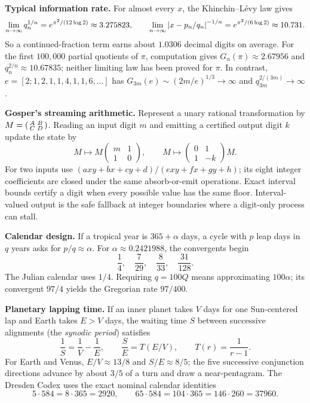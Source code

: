 \textbf{Typical information rate.} For almost every $x$, the Khinchin--L\'evy
law gives
\[
 \lim_{n\to\infty}q_n^{1/n}=e^{\pi^2/(12\log2)}\approx3.275823,
 \qquad
 \lim_{n\to\infty}\left|x-p_n/q_n\right|^{-1/n}
 =e^{\pi^2/(6\log2)}\approx10.731.
\]
So a continued-fraction term earns about $1.0306$ decimal digits on average.
For the first $100{,}000$ partial quotients of $\pi$, computation gives
$G_n(\pi)\approx2.67956$ and $q_n^{2/n}\approx10.67835$; neither limiting law
has been proved for $\pi$. In contrast,
$e=[2;1,2,1,1,4,1,1,6,\dots]$ has
$G_{3m}(e)\sim(2m/e)^{1/3}\to\infty$ and $q_{3m}^{2/(3m)}\to\infty$.

\textbf{Gosper's streaming arithmetic.} Represent a unary rational
transformation by $M=\begin{psmallmatrix}A&B\\C&D\end{psmallmatrix}$.  Reading
an input digit $m$ and emitting a certified output digit $k$ update the state by
\[
 M\longmapsto M\begin{pmatrix}m&1\\1&0\end{pmatrix},
 \qquad
 M\longmapsto\begin{pmatrix}0&1\\1&-k\end{pmatrix}M.
\]
For two inputs use
$(axy+bx+cy+d)/(exy+fx+gy+h)$; its eight integer coefficients are closed
under the same absorb-or-emit operations.  Exact interval bounds certify a
digit when every possible value has the same floor.  Interval-valued output is
the safe fallback at integer boundaries where a digit-only process can stall.

\textbf{Calendar design.} If a tropical year is $365+\alpha$ days, a cycle
with $p$ leap days in $q$ years asks for $p/q\approx\alpha$. For
$\alpha\approx0.2421988$, the convergents begin
\[
 \frac14,\quad\frac7{29},\quad\frac8{33},\quad\frac{31}{128}.
\]
The Julian calendar uses $1/4$. Requiring $q=100Q$ means approximating
$100\alpha$; its convergent $97/4$ yields the Gregorian rate $97/400$.

\textbf{Planetary lapping time.} If an inner planet takes $V$ days for one
Sun-centered lap and Earth takes $E>V$ days, the waiting time $S$ between
successive alignments (the \emph{synodic period}) satisfies
\[
  \frac1S=\frac1V-\frac1E,
  \qquad \frac SE=T(E/V),\qquad T(r)=\frac1{r-1}.
\]
For Earth and Venus, $E/V\approx13/8$ and $S/E\approx8/5$; the five
successive conjunction directions advance by about $3/5$ of a turn and draw a
near-pentagram.  The Dresden Codex uses the exact nominal calendar identities
\[
  5\cdot584=8\cdot365=2920,
  \qquad
  65\cdot584=104\cdot365=146\cdot260=37960.
\]

